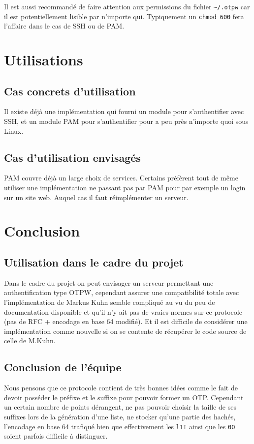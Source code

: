 \documentclass{../res/univ-projet}
\begin{document}
        Il est aussi recommandé de faire attention aux permissions du fichier \verb?~/.otpw? car
    il est potentiellement lisible par n'importe qui. Typiquement un \verb?chmod 600? fera l'affaire
    dans le cas de SSH ou de PAM.

\section{Utilisations}
\subsection{Cas concrets d'utilisation}
        Il existe déjà une implémentation qui fourni un module pour s'authentifier avec SSH, et un module
    PAM pour s'authentifier pour a peu près n'importe quoi sous Linux.

\subsection{Cas d'utilisation envisagés}
        PAM couvre déjà un large choix de services. Certains préfèrent tout de même utiliser une implémentation
    ne passant pas par PAM pour par exemple un login sur un site web. Auquel cas il faut réimplémenter un serveur.

\section{Conclusion}
\subsection{Utilisation dans le cadre du projet}
        Dans le cadre du projet on peut envisager un serveur permettant une authentification type OTPW, cependant
    assurer une compatibilité totale avec l'implémentation de Markus Kuhn semble compliqué au vu du peu de documentation
    disponible et qu'il n'y ait pas de \og vraies\fg{} normes sur ce protocole (pas de RFC + encodage en base 64 modifié).
    Et il est difficile de considérer une implémentation comme nouvelle si on se contente de récupérer le code source
    de celle de M.Kuhn.

\subsection{Conclusion de l'équipe}
        Nous pensons que ce protocole contient de très bonnes idées comme le fait de devoir posséder le préfixe et
    le suffixe pour pouvoir former un OTP. Cependant un certain nombre de points dérangent, ne pas pouvoir choisir la
    taille de ses suffixes lors de la génération d'une liste, ne stocker qu'une partie des hachés, l'encodage en base 64 
    trafiqué bien que effectivement les \verb?l1I? ainsi que les \verb?0O? soient parfois difficile à distinguer. 
\end{document}
